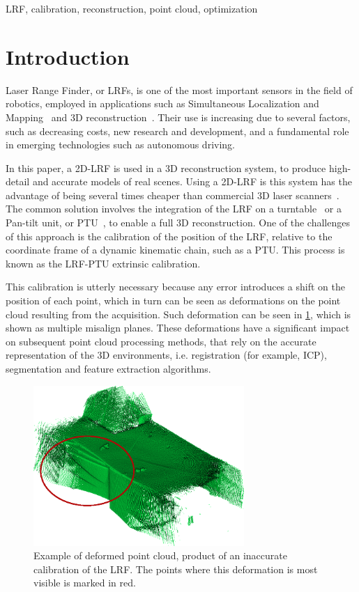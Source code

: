 \documentclass[conference]{IEEEtran}
\begin{document}
\begin{IEEEkeywords}
LRF, calibration, reconstruction, point cloud, optimization
\end{IEEEkeywords}

\section{Introduction}\label{section:introduction}

Laser Range Finder, or LRFs, is one of the most important sensors in the field of robotics, employed in applications such as Simultaneous Localization and Mapping~\cite{wang14,eyice18} and 3D reconstruction~\cite{saito10}. Their use is increasing due to several factors, such as decreasing costs, new research and development, and a fundamental role in emerging technologies such as autonomous driving.

In this paper, a 2D-LRF is used in a 3D reconstruction system, to produce high-detail and accurate models of real scenes. Using a 2D-LRF is this system has the advantage of being several times cheaper than commercial 3D laser scanners~\cite{dias06}. The common solution involves the integration of the LRF on a turntable~\cite{maurelli09} or a Pan-tilt unit, or PTU~\cite{klimentjew09}, to enable a full 3D reconstruction. One of the challenges of this approach is the calibration of the position of the LRF, relative to the coordinate frame of a dynamic kinematic chain, such as a PTU. This process is known as the LRF-PTU extrinsic calibration.

This calibration is utterly necessary because any error introduces a shift on the position of each point, which in turn can be seen as deformations on the point cloud resulting from the acquisition. Such deformation can be seen in \cref{fig:deformed-pointcloud}, which is shown as multiple misalign planes. These deformations have a significant impact on subsequent point cloud processing methods, that rely on the accurate representation of the 3D environments, i.e. registration (for example, ICP), segmentation and feature extraction algorithms. 

\begin{figure}[h]
    \centering
    \includegraphics[width=8cm]{images/bad-pointcloud.png}
    \caption{Example of deformed point cloud, product of an inaccurate calibration of the LRF. The points where this deformation is most visible is marked in red.}
    \label{fig:deformed-pointcloud}
\end{figure}
\end{document}
